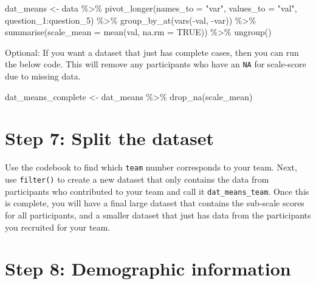 \documentclass[
  oneside]{book}
\newenvironment{Shaded}{\begin{snugshade}}{\end{snugshade}}
\newcommand{\AttributeTok}[1]{\textcolor[rgb]{0.77,0.63,0.00}{#1}}
\newcommand{\ConstantTok}[1]{\textcolor[rgb]{0.00,0.00,0.00}{#1}}
\newcommand{\FunctionTok}[1]{\textcolor[rgb]{0.00,0.00,0.00}{#1}}
\newcommand{\NormalTok}[1]{#1}
\newcommand{\OtherTok}[1]{\textcolor[rgb]{0.56,0.35,0.01}{#1}}
\newcommand{\SpecialCharTok}[1]{\textcolor[rgb]{0.00,0.00,0.00}{#1}}
\newcommand{\StringTok}[1]{\textcolor[rgb]{0.31,0.60,0.02}{#1}}
\begin{document}
\begin{Shaded}
\begin{Highlighting}[]
\NormalTok{dat\_means }\OtherTok{\textless{}{-}}\NormalTok{ data }\SpecialCharTok{\%\textgreater{}\%} 
  \FunctionTok{pivot\_longer}\NormalTok{(}\AttributeTok{names\_to =} \StringTok{"var"}\NormalTok{, }\AttributeTok{values\_to =} \StringTok{"val"}\NormalTok{, question\_1}\SpecialCharTok{:}\NormalTok{question\_5) }\SpecialCharTok{\%\textgreater{}\%} 
  \FunctionTok{group\_by\_at}\NormalTok{(}\FunctionTok{vars}\NormalTok{(}\SpecialCharTok{{-}}\NormalTok{val, }\SpecialCharTok{{-}}\NormalTok{var)) }\SpecialCharTok{\%\textgreater{}\%} 
  \FunctionTok{summarise}\NormalTok{(}\AttributeTok{scale\_mean =} \FunctionTok{mean}\NormalTok{(val, }\AttributeTok{na.rm =} \ConstantTok{TRUE}\NormalTok{)) }\SpecialCharTok{\%\textgreater{}\%} 
  \FunctionTok{ungroup}\NormalTok{() }
\end{Highlighting}
\end{Shaded}

Optional: If you want a dataset that just has complete cases, then you can run the below code. This will remove any participants who have an \texttt{NA} for scale-score due to missing data.

\begin{Shaded}
\begin{Highlighting}[]
\NormalTok{dat\_means\_complete }\OtherTok{\textless{}{-}}\NormalTok{ dat\_means }\SpecialCharTok{\%\textgreater{}\%}
  \FunctionTok{drop\_na}\NormalTok{(scale\_mean)}
\end{Highlighting}
\end{Shaded}

\hypertarget{step-7-split-the-dataset}{%
\section{Step 7: Split the dataset}\label{step-7-split-the-dataset}}

Use the codebook to find which \texttt{team} number corresponds to your team. Next, use \texttt{filter()} to create a new dataset that only contains the data from participants who contributed to your team and call it \texttt{dat\_means\_team}. Once this is complete, you will have a final large dataset that contains the sub-scale scores for all participants, and a smaller dataset that just has data from the participants you recruited for your team.

\hypertarget{step-8-demographic-information}{%
\section{Step 8: Demographic information}\label{step-8-demographic-information}}
\end{document}
